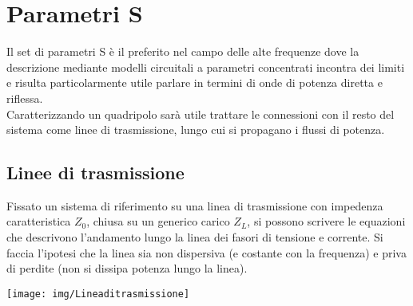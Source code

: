 \chapter{Parametri S}

Il set di parametri S è il preferito nel campo delle alte frequenze dove la descrizione mediante modelli circuitali a parametri concentrati incontra dei limiti e risulta particolarmente utile parlare in termini di onde di potenza diretta e riflessa.
\\
Caratterizzando un quadripolo sarà utile trattare le connessioni con il resto del sistema come linee di trasmissione, lungo cui si propagano i flussi di potenza.

\section{Linee di trasmissione}


\begin{multicols}{2}
	Fissato un sistema di riferimento su una linea di trasmissione con impedenza caratteristica $Z_0$, chiusa su un generico carico $Z_L$, si possono scrivere le equazioni che descrivono l'andamento lungo la linea dei fasori di tensione e corrente. Si faccia l'ipotesi che la linea sia non dispersiva (e costante con la frequenza) e priva di perdite (non si dissipa potenza lungo la linea).
	
	\columnbreak
	\centering
	\null\vfill
	\texttt{[image: img/Lineaditrasmissione]}
	\vfill\null
\end{multicols}

